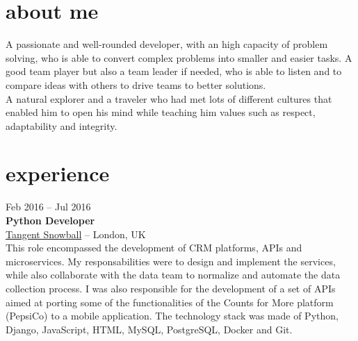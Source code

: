 \documentclass[]{friggeri-cv}
\begin{document}
\section{about me}
{
A passionate and well-rounded developer, with an high capacity of problem solving, who is able to convert complex problems into smaller and easier tasks. A good team player but also a team leader if needed, who is able to listen and to compare ideas with others to drive teams to better solutions. \\
A natural explorer and a traveler who had met lots of different cultures that enabled him to open his mind while teaching him values such as respect, adaptability and integrity.}


\section{experience}

{Feb 2016 -- Jul 2016} \\
{\textbf{Python Developer}} \\
{\href{http://www.tangentsnowball.com}{Tangent Snowball}} -- {London, UK} \\
{This role encompassed the development of CRM platforms, APIs and microservices. My responsabilities were to design and implement the services, while also collaborate with the data team to normalize and automate the data collection process.
I was also responsible for the development of a set of APIs aimed at porting some of the functionalities of the Counts for More platform (PepsiCo) to a mobile application.
The technology stack was made of Python, Django, JavaScript, HTML, MySQL, PostgreSQL, Docker and Git.}
\end{document}
